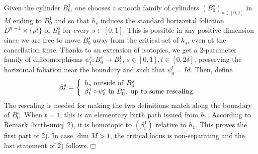\documentclass[12pt]{amsart}
\def\de{\delta}
\def\nd{\noindent}
\def\bull{\hfill$\Box$\\}
\begin{document}
\nd {\bf Proof of 2).}
Given the cylinder $B^1_0$, one chooses a smooth family of cylinders $\left(B_0^s\right)_{s\in [0,1]}$ in $M$ ending to $B^1_0$ %
and so that 
$h_s$ induces the standard horizontal foliation $D^{n-1}\times\{pt\}$ of $B^s_0$ for every $s\in [0,1]$. 
 This is possible in any positive dimension since we are free to move $B^s_0$ away from the critical set 
 of $h_s$, even at the cancellation time.
 Thanks to an extension of isotopies,
  we get %
a 2-parameter family of diffeomorphisms $\psi_t^s: B_0^s\to B^1_t$, $s\in [0,1], t\in[0,2\de]$,
preserving the horizontal foliation near the boundary and
such that $\psi^1_0= Id$. Then, define 
$$
\beta_t^s=\left\{
\begin{array}{l} 
h_s {\rm \ outside\ of\ }B_0^s\\
\beta^1_t\circ\psi_t^s\ {\rm in\ } B_0^s, \ {\rm up\ to\ some\ rescaling.}
\end{array}
\right.
$$ 
The rescaling is needed for making the two definitions match along the boundary of $B_0^s$.
When $t=1$, this is an elementary birth path issued from $h_1$. According to  Remark \ref{birth-uniq} 2),
it is homotopic to $\left(\beta_t^1\right)$ relative to $h_1$. This proves the first part of 2).
In case $\dim M>1$,  the critical locus is non-separating and the last statement of 2) follows.\bull\\
\end{document}
